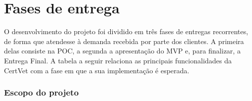 \documentclass[
    12pt,               %
    openright,          %
    oneside,
    a4paper,            %
    BIBLATEX,           %
    TODO,               %
    english,            %
    brazil              %
    ]{ifsp-spo-inf-ctds}
\begin{document}
    \section{Fases de entrega}
    
        O desenvolvimento do projeto foi dividido em três fases de entregas recorrentes, de forma que atendesse à demanda recebida por parte dos clientes. A primeira delas consiste na POC, a segunda a apresentação do MVP e, para finalizar, a Entrega Final. A tabela a seguir relaciona as principais funcionalidades da CertVet com a fase em que a sua implementação é esperada.
    
        \subsubsection{Escopo do projeto}
            \begin{table}[H]
                \centering
\end{table}
\end{document}
